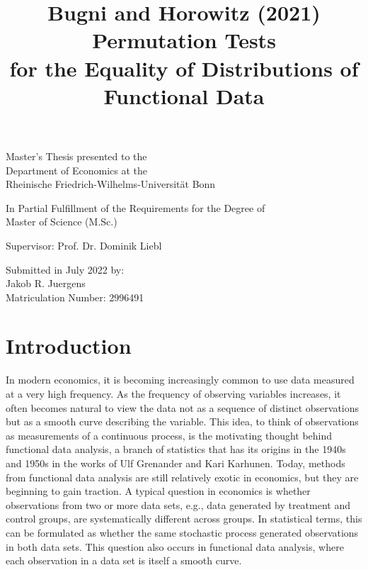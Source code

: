 \documentclass[12pt, a4paper]{article}
\theoremstyle{MAstyle} \newtheorem{assumption}{Assumption}[section]
\theoremstyle{MAstyle} \newtheorem{definition}{Definition}[section]
\theoremstyle{MAstyle} \newtheorem{theorem}{Theorem}[section]
\begin{document}
	
	\title{{\huge Bugni and Horowitz (2021) Permutation Tests\\ for the Equality of Distributions of\\ Functional Data}}
	\date{}
	\maketitle
	\thispagestyle{empty}
	\vspace{1.5 cm}
	\begin{center}
		
		\Large
		Master's Thesis presented to the\\
		Department of Economics at the\\
		Rheinische Friedrich-Wilhelms-Universität Bonn
		\vspace{1.5cm}

		\large
		In Partial Fulfillment of the Requirements for the Degree of\\
		Master of Science (M.Sc.)
		
		\vspace{3cm}
		
		Supervisor: Prof. Dr. Dominik Liebl
		
		\vspace{3cm}
		
		Submitted in July 2022 by: \\
		Jakob R. Juergens\\
		Matriculation Number: 2996491
	\end{center}
	
	\newpage
	
	\thispagestyle{empty}
	\tableofcontents
	\thispagestyle{empty}
	
	\newpage
	
	\section{Introduction}
		In modern economics, it is becoming increasingly common to use data measured at a very high frequency. As the frequency of observing variables increases, it often becomes natural to view the data not as a sequence of distinct observations but as a smooth curve describing the variable.
		This idea, to think of observations as measurements of a continuous process, is the motivating thought behind functional data analysis, a branch of statistics that has its origins in the 1940s and 1950s in the works of Ulf Grenander and Kari Karhunen. Today, methods from functional data analysis are still relatively exotic in economics, but they are beginning to gain traction.
		A typical question in economics is whether observations from two or more data sets, e.g., data generated by treatment and control groups, are systematically different across groups. In statistical terms, this can be formulated as whether the same stochastic process generated observations in both data sets.			
		This question also occurs in functional data analysis, where each observation in a data set is itself a smooth curve. \\
		
\end{document}
